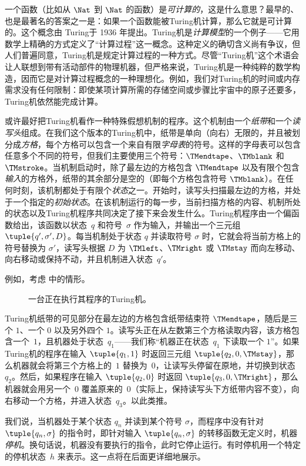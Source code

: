\documentclass[../../../include/open-logic-section]{subfiles}
\begin{document}

一个函数（比如从 $\Nat$ 到 $\Nat$ 的函数）是\emph{可计算的}，这是什么意思？最早的、也是最著名的答案之一是：如果一个函数能被Turing机计算，那么它就是可计算的。这个概念由 Turing于 1936 年提出。Turing机是\emph{计算模型}的一个例子——它用数学上精确的方式定义了“计算过程”这一概念。这种定义的确切含义尚有争议，但人们普遍同意，Turing机是规定计算过程的一种方式。尽管“Turing机”这个术语会让人联想到带有活动部件的物理机器，但严格来说，Turing机是一种纯粹的数学构造，因而它是对计算过程概念的一种理想化。例如，我们对Turing机的时间或内存需求没有任何限制：即使某项计算所需的存储空间或步骤比宇宙中的原子还要多，Turing机依然能完成计算。

\begin{explain}
或许最好把Turing机看作一种特殊假想机制的程序。这个机制由一个\emph{纸带}和一个\emph{读写头}组成。在我们这个版本的Turing机中，纸带是单向（向右）无限的，并且被划分成\emph{方格}，每个方格可以包含一个来自有限\emph{字母表}的符号。这样的字母表可以包含任意多个不同的符号，但我们主要使用三个符号：$\TMendtape$、$\TMblank$ 和 $\TMstroke$。当机制启动时，除了最左边的方格包含 $\TMendtape$ 以及有限个包含\emph{输入}的方格外，纸带的其余部分是空的（即每个方格包含符号 $\TMblank$）。在任何时刻，该机制都处于有限个\emph{状态}之一。开始时，读写头扫描最左边的方格，并处于一个指定的\emph{初始状态}。在该机制运行的每一步，当前扫描方格的内容、机制所处的状态以及Turing机程序共同决定了接下来会发生什么。Turing机程序由一个偏函数给出，该函数以状态~$q$ 和符号~$\sigma$ 作为输入，并输出一个三元组~$\tuple{q', \sigma', D}$。每当机制处于状态 $q$ 并读取符号 $\sigma$ 时，它就会将当前方格上的符号替换为 $\sigma'$，读写头根据 $D$ 为 $\TMleft$、$\TMright$ 或 $\TMstay$ 而向左移动、向右移动或保持不动，并且机制进入状态~$q'$。

例如，考虑  中的情形。
\begin{figure}
  \caption{一台正在执行其程序的Turing机。}
\end{figure}
Turing机纸带的可见部分在最左边的方格包含纸带结束符 $\TMendtape$，随后是三个 $1$、一个 $0$ 以及另外四个 $1$。读写头正在从左数第三个方格读取内容，该方格包含一个~$1$，且机器处于状态~$q_1$——我们称“机器正在状态~$q_1$ 下读取一个 $1$”。如果Turing机的程序在输入 $\tuple{q_1, 1}$ 时返回三元组 $\tuple{q_2, 0, \TMstay}$，那么机器就会将第三个方格上的~$1$ 替换为~$0$，让读写头停留在原地，并切换到状态~$q_2$。然后，如果程序在输入 $\tuple{q_2, 0}$ 时返回 $\tuple{q_3, 0, \TMright}$，那么机器就会用另一个~$0$ 覆盖原来的~$0$（实际上，保持读写头下方纸带内容不变），向右移动一个方格，并进入状态~$q_3$。以此类推。

我们说，当机器处于某个状态 $q_n$ 并读到某个符号 $\sigma$，而程序中没有针对 $\tuple{q_n, \sigma}$ 的指令时，即针对输入 $\tuple{q_n,\sigma}$ 的转移函数无定义时，机器\emph{停机}。换句话说，机器没有要执行的指令，此时它停止运行。有时停机用一个特定的停机状态~$h$ 来表示。这一点将在后面更详细地展示。
\end{explain}
\end{document}
